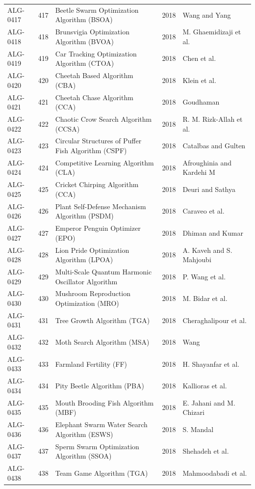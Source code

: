 \documentclass[8pt]{article}
\begin{document}
\begin{landscape}
\begin{longtable}{P{1.7cm}rP{10.0cm}rP{7.2cm}}
ALG-0417 & 417 & Beetle Swarm Optimization Algorithm (BSOA) & 2018 & Wang and Yang \\
ALG-0418 & 418 & Brunsvigia Optimization Algorithm (BVOA) & 2018 & M. Ghaemidizaji et al. \\
ALG-0419 & 419 & Car Tracking Optimization Algorithm (CTOA) & 2018 & Chen et al. \\
ALG-0420 & 420 & Cheetah Based Algorithm (CBA) & 2018 & Klein et al. \\
ALG-0421 & 421 & Cheetah Chase Algorithm (CCA) & 2018 & Goudhaman \\
ALG-0422 & 422 & Chaotic Crow Search Algorithm (CCSA) & 2018 & R. M. Rizk-Allah et al. \\
ALG-0423 & 423 & Circular Structures of Puffer Fish Algorithm (CSPF) & 2018 & Catalbas and Gulten \\
ALG-0424 & 424 & Competitive Learning Algorithm (CLA) & 2018 & Afroughinia and Kardehi M \\
ALG-0425 & 425 & Cricket Chirping Algorithm (CCA) & 2018 & Deuri and Sathya \\
ALG-0426 & 426 & Plant Self-Defense Mechanism Algorithm (PSDM) & 2018 & Caraveo et al. \\
ALG-0427 & 427 & Emperor Penguin Optimizer (EPO) & 2018 & Dhiman and Kumar \\
ALG-0428 & 428 & Lion Pride Optimization Algorithm (LPOA) & 2018 & A. Kaveh and S. Mahjoubi \\
ALG-0429 & 429 & Multi-Scale Quantum Harmonic Oscillator Algorithm & 2018 & P. Wang et al. \\
ALG-0430 & 430 & Mushroom Reproduction Optimization (MRO) & 2018 & M. Bidar et al. \\
ALG-0431 & 431 & Tree Growth Algorithm (TGA) & 2018 & Cheraghalipour et al. \\
ALG-0432 & 432 & Moth Search Algorithm (MSA) & 2018 & Wang \\
ALG-0433 & 433 & Farmland Fertility (FF) & 2018 & H. Shayanfar et al. \\
ALG-0434 & 434 & Pity Beetle Algorithm (PBA) & 2018 & Kallioras et al. \\
ALG-0435 & 435 & Mouth Brooding Fish Algorithm (MBF) & 2018 & E. Jahani and M. Chizari \\
ALG-0436 & 436 & Elephant Swarm Water Search Algorithm (ESWS) & 2018 & S. Mandal \\
ALG-0437 & 437 & Sperm Swarm Optimization Algorithm (SSOA) & 2018 & Shehadeh et al. \\
ALG-0438 & 438 & Team Game Algorithm (TGA) & 2018 & Mahmoodabadi et al. \\

\end{longtable}
\end{landscape}
\end{document}
